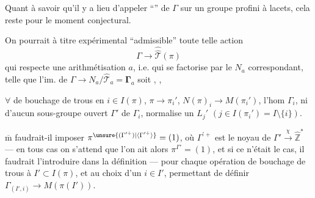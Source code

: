 Quant à savoir  qu'il y a lieu
d'appeler   ``'' de
$\Gamma$ sur un groupe  \unsure{(}profini\unsure{)|,} à lacets,
cela reste pour le moment conjectural.

On pourrait à titre expérimental
 
``admissible'' toute telle action
\[
 \Gamma\longrightarrow\widehat{\widehat{\mathcal T}}(\pi)
\]
qui respecte une arithmétisation $a$,
i.e. qui se factorise par le $N_a$ correspondant,  telle que l'im. de
$\Gamma\longrightarrow N_a/\widehat{\mathcal T}_a=\boldsymbol{\Gamma}_a$
soit ,
, 

$\forall$  de bouchage de trous en $i\in I(\pi)$,
$\pi\longrightarrow\pi_i'$, $N(\pi)_i\longrightarrow M(\pi_i')$, l'hom 
$\Gamma_i$, ni d'aucun sous-groupe ouvert $\Gamma'$
de $\Gamma_i$,  normalise un $L_j'$ $(j\in I(\pi_i')=I\setminus\{i\})$.


 $\overline{\mathrm m}$ faudrait-il imposer
$\pi^{\unsure{(\Gamma^{\prime+})|\langle\Gamma^{\prime+}\rangle}}=(1)$, où $\Gamma^{\prime+}$ est le noyau de
$\Gamma'\xrightarrow{\chi}\widehat{\mathbb Z}^{*}$ --- en tous cas on s'attend
\unsure{---} que l'on ait alors $\pi^{\Gamma'}=(1)$,
et si ce n'était le cas, il faudrait
l'introduire dans la définition --- pour
chaque opération de bouchage de trous
 à $I'\subset I(\pi)$, et au choix d'un
$i\in I'$, permettant de définir $\Gamma_{(I',i)}\longrightarrow M(\pi(I'))$.

